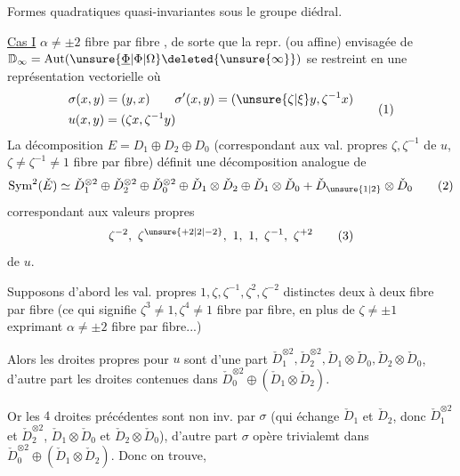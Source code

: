 Formes quadratiques quasi-invariantes sous le groupe diédral.

\uline{Cas I} $\alpha\ne\pm2$ fibre par fibre , de sorte que la repr.  (ou affine) envisagée de $\mathbb D_\infty=\operatorname{Aut}(\unsure{\underline\Phi|\Phi|\Omega}\deleted{\unsure{\infty}})$ se restreint en une représentation vectorielle où
\[
\begin{aligned}
&\sigma(x,y)=(y,x)\qquad \sigma'(x,y)=(\unsure{\zeta|\xi}y,\zeta^{-1}x)\\
&u(x,y)=(\zeta x,\zeta^{-1}y)
\end{aligned}\tag*{(1)}
\]
La décomposition $E=D_1\oplus D_2\oplus D_0$ (correspondant aux val. propres $\zeta,\zeta^{-1}$ de $u$\unsure{$\}$|,}, $\zeta\ne\zeta^{-1}\ne1$ fibre par fibre) définit une décomposition analogue de
\[
\operatorname{Sym}^{2}(\check E)\simeq
\check D_1^{\otimes2}\oplus\check D_2^{\otimes2}\oplus\check D_0^{\otimes2}
\oplus\check D_1\otimes\check D_2\oplus\check D_1\otimes\check D_0+
\check D_{\unsure{1|2}}\otimes\check D_0
\tag*{(2)}
\]
correspondant aux valeurs propres
\[
\zeta^{-2},\ \zeta^{\unsure{+2|2|-2}},\ 1,\ 1,\ \zeta^{-1},\ \zeta^{+2}
\tag*{(3)}
\]
de $u$.

Supposons d'abord les  val. propres $1,\zeta,\zeta^{-1},\zeta^{2},\zeta^{-2}$ distinctes deux à deux fibre par fibre (ce qui signifie $\zeta^3\ne1,\zeta^4\ne1$ fibre par fibre, en plus de $\zeta\ne\pm1$  exprimant $\alpha\ne\pm2$ fibre par fibre...)

Alors les droites propres pour $u$ sont  d'une part $\check D_1^{\otimes2},\check D_2^{\otimes2},\check D_1\otimes\check D_0,\check D_2\otimes\check D_0$, d'autre part les droites contenues  dans $\check D_0^{\otimes2}\oplus(\check D_1\otimes\check D_2)$.

Or les $4$ droites précédentes sont non inv. par $\sigma$ (qui échange $\check D_1$ et $\check D_2$, donc $\check D_1^{\otimes2}$ et $\check D_2^{\otimes2}$, $\check D_1\otimes\check D_0$ et $\check D_2\otimes\check D_0$), d'autre part $\sigma$ opère trivialemt dans $\check D_0^{\otimes2}\oplus(\check D_1\otimes\check D_2)$. Donc on trouve, 

